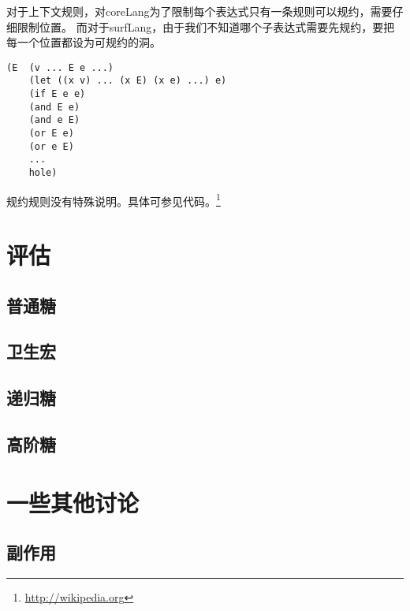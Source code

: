 对于上下文规则，对coreLang为了限制每个表达式只有一条规则可以规约，需要仔细限制位置。
而对于surfLang，由于我们不知道哪个子表达式需要先规约，要把每一个位置都设为可规约的洞。
\begin{verbatim}
(E  (v ... E e ...)
	(let ((x v) ... (x E) (x e) ...) e)
	(if E e e)
	(and E e)
	(and e E)
	(or E e)
	(or e E)
	...
	hole)
\end{verbatim}

规约规则没有特殊说明。具体可参见代码。\footnote{\url{http://wikipedia.org}}
\section{评估}

\subsection{普通糖}

\subsection{卫生宏}

\subsection{递归糖}

\subsection{高阶糖}

\section{一些其他讨论}

\subsection{副作用}